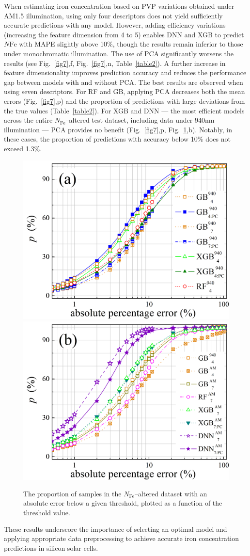 \documentclass[a4paper,fleqn]{cas-sc}
\begin{document}
When estimating iron concentration based on PVP variations obtained under AM1.5 illumination,
using only four descriptors does not yield sufficiently accurate predictions with any model.
However, adding efficiency variations (increasing the feature dimension from 4 to 5)
enables DNN and XGB to predict $N\mathrm{Fe}$ with MAPE slightly above 10\%,
though the results remain inferior to those under monochromatic illumination.
The use of PCA significantly worsens the results (see Fig.~\ref{fig7},f, Fig.~\ref{fig7},n, Table~\ref{table2}).
A further increase in feature dimensionality improves prediction accuracy and reduces the performance gap between models with and without PCA.
The best results are observed when using seven descriptors.
For RF and GB, applying PCA decreases both the mean errors (Fig.~\ref{fig7},p)
and the proportion of predictions with large deviations from the true values (Table~\ref{table2}).
For XGB and DNN --- the most efficient models across the entire $N_\mathrm{Fe}$--altered test dataset,
including data under 940nm illumination --- PCA provides no benefit (Fig.~\ref{fig7},p, Fig.~\ref{fig8},b).
Notably, in these cases, the proportion of predictions with accuracy below 10\% does not exceed 1.3\%.

\begin{figure}
  \centering
     \includegraphics[width=0.4\linewidth]{Fig8a.png}
     \includegraphics[width=0.4\linewidth]{Fig8b.png}
    \caption{The proportion of samples in the $N_\mathrm{Fe}$--altered dataset with an absolute error below a given threshold, plotted as a function of the threshold value.
}\label{fig8}
\end{figure}

These results underscore the importance of selecting an optimal model and applying appropriate data preprocessing
to achieve accurate iron concentration predictions in silicon solar cells.
\end{document}
